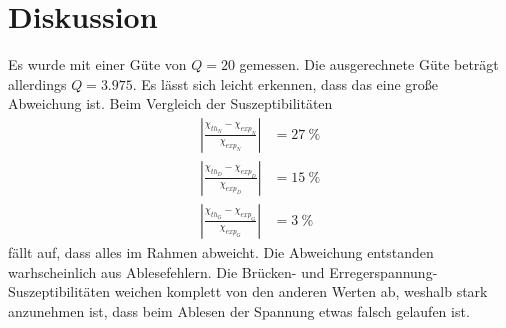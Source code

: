 \section{Diskussion}
\label{sec:Diskussion}

Es wurde mit einer Güte von $Q=20$ gemessen. Die ausgerechnete Güte beträgt allerdings $Q=3.975$. Es lässt sich leicht erkennen, dass das eine große Abweichung ist. 
Beim Vergleich der Suszeptibilitäten 
\begin{align*}
  |\frac{\chi_{th_{N}}-\chi_{exp_{N}}}{\chi_{exp_{N}}}|&=27\ \%\\
  |\frac{\chi_{th_{D}}-\chi_{exp_{D}}}{\chi_{exp_{D}}}|&=15\ \%\\
  |\frac{\chi_{th_{G}}-\chi_{exp_{G}}}{\chi_{exp_{G}}}|&=3\ \%
\end{align*}
fällt auf, dass alles im Rahmen abweicht. Die Abweichung entstanden warhscheinlich aus Ablesefehlern. Die Brücken- und Erregerspannung-Suszeptibilitäten weichen komplett von den anderen Werten ab, weshalb stark anzunehmen ist, dass beim Ablesen der Spannung etwas falsch gelaufen ist. 
